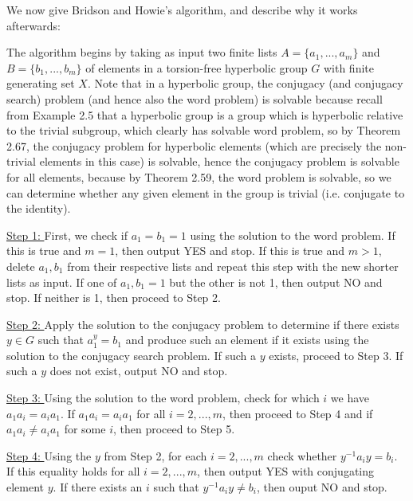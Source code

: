 \documentclass[12pt]{article}
\newcommand{\vs}{\vskip10pt}
\begin{document}
	\vs 
	
	We now give Bridson and Howie's algorithm, and describe why it works afterwards: 
	
	\vs 
	
	The algorithm begins by taking as input two finite lists $A = \{a_1,...,a_m\}$ and $B = \{b_1,...,b_m\}$ of elements in a torsion-free hyperbolic group $G$ with finite generating set $X$. Note that in a hyperbolic group, the conjugacy (and conjugacy search) problem (and hence also the word problem) is solvable because recall from Example 2.5 that a hyperbolic group is a group which is hyperbolic relative to the trivial subgroup, which clearly has solvable word problem, so by Theorem 2.67, the conjugacy problem for hyperbolic elements (which are precisely the non-trivial elements in this case) is solvable, hence the conjugacy problem is solvable for all elements, because by Theorem 2.59, the word problem is solvable, so we can determine whether any given element in the group is trivial (i.e. conjugate to the identity).  
	
	\vs 
	
	\underline{Step 1: } First, we check if $a_1 = b_1 = 1$ using the solution to the word problem. If this is true and $m = 1$, then output YES and stop. If this is true and $m > 1$, delete $a_1, b_1$ from their respective lists and repeat this step with the new shorter lists as input. If one of $a_1, b_1 = 1$ but the other is not 1, then output NO and stop. If neither is 1, then proceed to Step 2. 
	
	\vs 
	
	\underline{Step 2: } Apply the solution to the conjugacy problem to determine if there exists $y \in G$ such that $a_1^y = b_1$ and produce such an element if it exists using the solution to the conjugacy search problem. If such a $y$ exists, proceed to Step 3. If such a $y$ does not exist, output NO and stop. 
	
	\vs 
	
	\underline{Step 3: } Using the solution to the word problem, check for which $i$ we have $a_1 a_i = a_i a_1$. If $a_1 a_i = a_i a_1$ for all $i = 2,...,m$, then proceed to Step 4 and if $a_1 a_i \neq a_i a_1$ for some $i$, then proceed to Step 5. 
	
	\vs
	
	\underline{Step 4: } Using the $y$ from Step 2, for each $i = 2,...,m$ check whether $y^{-1} a_i y  = b_i$. If this equality holds for all $i = 2,...,m$, then output YES with conjugating element $y$. If there exists an $i$ such that $y^{-1} a_i y \neq b_i$, then ouput NO and stop. 
	
\end{document}
